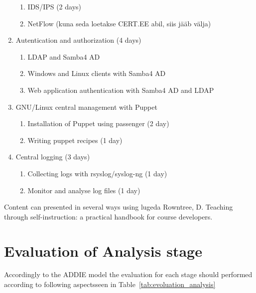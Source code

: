 \begin{enumerate}[label=Hands-on block \arabic*.,leftmargin=*]
\begin{enumerate}[label=LAB \arabic*.,leftmargin=*]
	  	\item IDS/IPS (2 days)
  		\item NetFlow (kuna seda loetakse CERT.EE abil, siis jääb välja)
    \end{enumerate}
    \item Autentication and authorization (4 days)
        \begin{enumerate}[label=LAB \arabic*.,leftmargin=*]
  		\item LDAP and Samba4 AD
	  	\item Windows and Linux clients with Samba4 AD 
  		\item Web application authentication with Samba4 AD and LDAP
    		\end{enumerate}
    \item GNU/Linux central management with Puppet
        \begin{enumerate}[label=LAB \arabic*.,leftmargin=*]
	  		\item Installation of Puppet using passenger (2 day)
		  	\item Writing puppet recipes (1 day)
    		\end{enumerate}
    	\item Central logging (3 days)
    	    \begin{enumerate}[label=LAB \arabic*.,leftmargin=*]
	  		\item Collecting logs with rsyslog/syslog-ng (1 day)
		  	\item Monitor and analyse log files (1 day)
    		\end{enumerate}
\end{enumerate}

Content can presented in several ways using {\color{red} lugeda Rowntree, D. Teaching through self-instruction: a practical handbook for course developers.} \citep{rowntree1986teaching}


\section{Evaluation of Analysis stage}

Accordingly to the \gls{ADDIE} model the evaluation for each stage should performed according to following aspectsseen in Table~\ref{tab:evoluation_analysis} \citep[p.~11]{OppeArenduskeskus2010}

